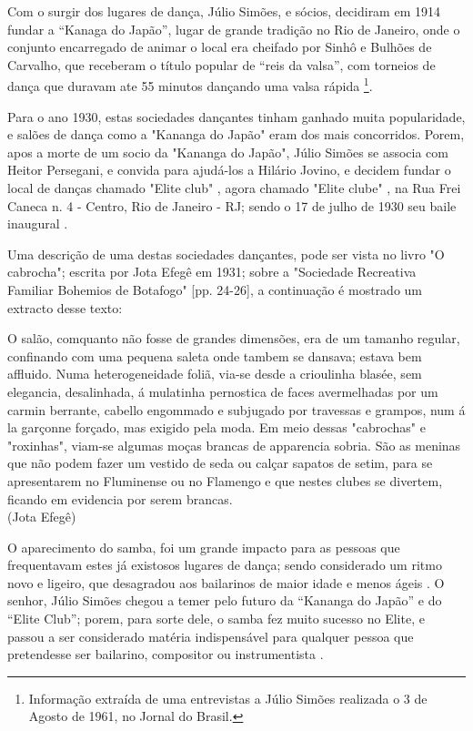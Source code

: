 Com o surgir dos lugares de dança, 
Júlio Simões, e sócios, decidiram em 1914 fundar a ``Kanaga do Japão'',
lugar de grande tradição no Rio de Janeiro,
onde o conjunto encarregado de animar o local era cheifado por Sinhô e Bulhões de Carvalho,
que receberam o título popular de ``reis da valsa'',
com torneios de dança que duravam ate 55 minutos dançando uma valsa rápida \cite[pp. 3]{entrevistajuliojournalbrasil1}
\footnote{Informação extraída de uma entrevistas a Júlio Simões realizada o 3 de Agosto de 1961, no Jornal do Brasil.}.

Para o ano 1930, estas sociedades dançantes tinham ganhado muita popularidade, e salões de dança como a
"Kananga do Japão" eram dos mais concorridos. Porem,
apos a morte de um socio da "Kananga do Japão", 
Júlio Simões se associa com Heitor Persegani, e convida para ajudá-los a Hilário Jovino, 
e decidem fundar o local de danças chamado "Elite club" \cite[pp. 11]{eliteinaugura},
agora chamado "Elite clube" \cite[pp. 3]{juliosimoes},
na Rua Frei Caneca n. 4 - Centro, Rio de Janeiro - RJ;
sendo o 17 de julho de 1930 seu baile inaugural 
\cite[pp. 11]{eliteinaugura} \cite[pp. 3]{juliosimoes} \cite[pp. 10]{simoesjournalbrasil1}.

Uma descrição de uma destas sociedades dançantes, pode ser vista no livro "O cabrocha"; 
escrita  por Jota Efegê em 1931; 
sobre a "Sociedade Recreativa Familiar Bohemios de Botafogo" [pp. 24-26]\cite{jotaefege},
a continuação é mostrado um extracto desse texto:
\begin{tcolorbox}[colback=lowgray,colframe=lowgray]%
O salão, comquanto não fosse de grandes dimensões, era
de um tamanho regular, confinando com uma pequena saleta
onde tambem se dansava; estava bem affluido. Numa
heterogeneidade foliã, via-se desde a crioulinha blasée, sem
elegancia, desalinhada, á mulatinha pernostica de faces
avermelhadas por um carmin berrante, cabello engommado e
subjugado por travessas e grampos, num á la garçonne
forçado, mas exigido pela moda. Em meio dessas "cabrochas"
e "roxinhas", viam-se algumas moças brancas de apparencia
sobria. São as meninas que não podem fazer um vestido de
seda ou calçar sapatos de setim, para se apresentarem no
Fluminense ou no Flamengo e que nestes clubes se divertem,
ficando em evidencia por serem brancas.
~\\
(Jota Efegê)
\end{tcolorbox}

O aparecimento do samba, 
foi um grande impacto para as pessoas que frequentavam estes já existosos lugares de dança;
sendo considerado um ritmo novo e ligeiro,
que desagradou aos bailarinos de maior idade e menos ágeis \cite[pp. 3]{entrevistajuliojournalbrasil1}.
O senhor, Júlio Simões chegou a temer pelo futuro da ``Kananga do Japão'' e
do ``Elite Club''; porem, para sorte dele, 
o samba fez muito sucesso no Elite,
e passou a ser considerado matéria indispensável para qualquer pessoa que pretendesse ser bailarino, 
compositor ou instrumentista \cite[pp. 3]{entrevistajuliojournalbrasil1}.

